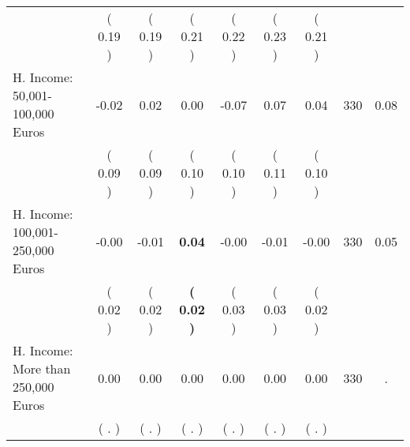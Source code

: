\begin{tabular}{lcccccccc}
 & (     0.19 ) & (     0.19 ) & (     0.21 ) & (     0.22 ) & (     0.23 ) & (     0.21 ) & \\
H. Income: 50,001-100,000 Euros &     -0.02 &      0.02 &      0.00 &     -0.07 &      0.07 &      0.04 & 330 &       0.08 \\ 
 & (     0.09 ) & (     0.09 ) & (     0.10 ) & (     0.10 ) & (     0.11 ) & (     0.10 ) & \\
H. Income: 100,001-250,000 Euros &     -0.00 &     -0.01 & \textbf{     0.04} &     -0.00 &     -0.01 &     -0.00 & 330 &       0.05 \\ 
 & (     0.02 ) & (     0.02 ) & \textbf{(     0.02 )} & (     0.03 ) & (     0.03 ) & (     0.02 ) & \\
H. Income: More than 250,000 Euros &      0.00 &      0.00 &      0.00 &      0.00 &      0.00 &      0.00 & 330 &          . \\ 
 & (        . ) & (        . ) & (        . ) & (        . ) & (        . ) & (        . ) & \\
\bottomrule
\end{tabular}
